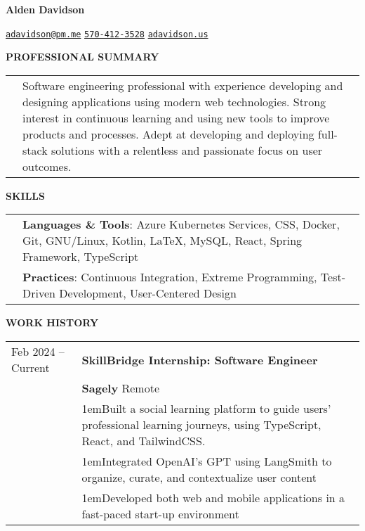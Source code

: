 \documentclass[11pt]{article}
\newlength{\dateColumnWidth}
\newcommand{\customBulletLabel}{\raisebox{0.4ex}{\tiny$\bullet$}}
\newcommand{\detail}{\par\noindent\makebox[1em][l]{\customBulletLabel}\hangindent1em}
\begin{document}
\begin{center}
    \begin{minipage}{0.70\textwidth}
        {\Huge\textbf{Alden Davidson}}
    \end{minipage}%
    \begin{minipage}{0.30\textwidth}
        \raggedleft
        \href{mailto:adavidson@pm.me}{\nolinkurl{adavidson@pm.me}}
        \href{tel:5704123528}{\nolinkurl{570-412-3528}}
        \href{https://adavidson.us}{\nolinkurl{adavidson.us}}
    \end{minipage}
\end{center}
{\Large \textbf{PROFESSIONAL SUMMARY}}
\bigbreak
\begin{tabularx}{\textwidth}{@{}p{\dateColumnWidth}X@{}}
     & Software engineering professional with experience developing and designing applications using modern web technologies.
    Strong interest in continuous learning and using new tools to improve products and processes.
    Adept at developing and deploying full-stack solutions with a relentless and passionate focus on user outcomes.
\end{tabularx}
\bigbreak
{\Large \textbf{SKILLS}}
\bigbreak
\begin{tabularx}{\textwidth}{@{}p{\dateColumnWidth}X@{}}
     & \textbf{Languages \& Tools}: Azure Kubernetes Services, CSS, Docker, Git, GNU/Linux, Kotlin, \LaTeX, MySQL, React, Spring Framework, TypeScript \\
     & \textbf{Practices}: Continuous Integration, Extreme Programming, Test-Driven Development, User-Centered Design                                  \\
\end{tabularx}
\bigbreak
{\Large \textbf{WORK HISTORY}}
\bigbreak
\begin{tabularx}{\textwidth}{@{}p{\dateColumnWidth}X@{}}
    Feb 2024 -- Current & \textbf{SkillBridge Internship: Software Engineer}                                                                                 \\
                        & \textbf{Sagely} \textbar{} Remote                                                                                                  \\
                        & \detail Built a social learning platform to guide users' professional learning journeys, using TypeScript, React, and TailwindCSS. \\
                        & \detail Integrated OpenAI's GPT using LangSmith to organize, curate, and contextualize user content                                \\
                        & \detail Developed both web and mobile applications in a fast-paced start-up environment                                            \\
\end{tabularx}
\end{document}
